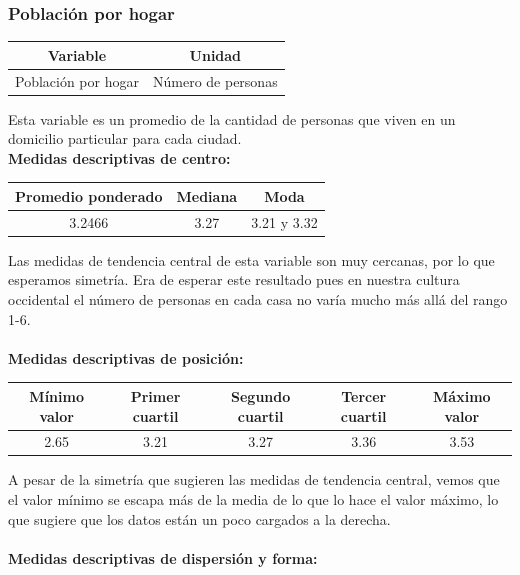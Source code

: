 \documentclass[11pt]{article}
\begin{document}
\subsubsection{Población por hogar}

\begin{center}
\begin{tabular}{|c|c|}
    \hline
    Variable & Unidad  \\ \hline
    Población por hogar & Número de personas \\
    \hline
\end{tabular}
\end{center}

Esta variable es un promedio de la cantidad de personas que viven en un domicilio particular para cada ciudad.
\\

\textbf{Medidas descriptivas de centro:}

\begin{center}
\begin{tabular}{|c|c|c|}
    \hline
    Promedio ponderado & Mediana & Moda \\ \hline
    3.2466 & 3.27 & 3.21 y 3.32 \\
    \hline
\end{tabular}
\end{center}

Las medidas de tendencia central de esta variable son muy cercanas, por lo que esperamos simetría. Era de esperar este resultado pues en nuestra cultura occidental el número de personas en cada casa no varía mucho más allá del rango 1-6.
\\
\\
\textbf{Medidas descriptivas de posición:}

\begin{center}
\begin{tabular}{|c|c|c|c|c|}
    \hline
    Mínimo valor & Primer cuartil & Segundo cuartil & Tercer cuartil & Máximo valor\\ \hline
    2.65 & 3.21 & 3.27 & 3.36 & 3.53\\
    \hline
\end{tabular}
\end{center}

A pesar de la simetría que sugieren las medidas de tendencia central, vemos que el valor mínimo se escapa más de la media de lo que lo hace el valor máximo, lo que sugiere que los datos están un poco cargados a la derecha.
\\
\\
\textbf{Medidas descriptivas de dispersión y forma:}
\end{document}
